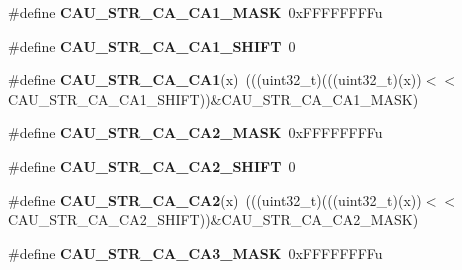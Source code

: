 \begin{DoxyCompactItemize}
\item 
\#define {\bfseries C\+A\+U\+\_\+\+S\+T\+R\+\_\+\+C\+A\+\_\+\+C\+A1\+\_\+\+M\+A\+SK}~0x\+F\+F\+F\+F\+F\+F\+F\+Fu\hypertarget{group__CAU__Register__Masks_gaf5468a65fe021f5053a4d9fa83c77614}{}\label{group__CAU__Register__Masks_gaf5468a65fe021f5053a4d9fa83c77614}

\item 
\#define {\bfseries C\+A\+U\+\_\+\+S\+T\+R\+\_\+\+C\+A\+\_\+\+C\+A1\+\_\+\+S\+H\+I\+FT}~0\hypertarget{group__CAU__Register__Masks_gaf733a0f562c8ff07f24843f2971c85ed}{}\label{group__CAU__Register__Masks_gaf733a0f562c8ff07f24843f2971c85ed}

\item 
\#define {\bfseries C\+A\+U\+\_\+\+S\+T\+R\+\_\+\+C\+A\+\_\+\+C\+A1}(x)~(((uint32\+\_\+t)(((uint32\+\_\+t)(x))$<$$<$C\+A\+U\+\_\+\+S\+T\+R\+\_\+\+C\+A\+\_\+\+C\+A1\+\_\+\+S\+H\+I\+FT))\&C\+A\+U\+\_\+\+S\+T\+R\+\_\+\+C\+A\+\_\+\+C\+A1\+\_\+\+M\+A\+SK)\hypertarget{group__CAU__Register__Masks_gac941842d240ab2902d1589d14f016339}{}\label{group__CAU__Register__Masks_gac941842d240ab2902d1589d14f016339}

\item 
\#define {\bfseries C\+A\+U\+\_\+\+S\+T\+R\+\_\+\+C\+A\+\_\+\+C\+A2\+\_\+\+M\+A\+SK}~0x\+F\+F\+F\+F\+F\+F\+F\+Fu\hypertarget{group__CAU__Register__Masks_ga7a41f2c437556c9a48ed99cd8607a9f9}{}\label{group__CAU__Register__Masks_ga7a41f2c437556c9a48ed99cd8607a9f9}

\item 
\#define {\bfseries C\+A\+U\+\_\+\+S\+T\+R\+\_\+\+C\+A\+\_\+\+C\+A2\+\_\+\+S\+H\+I\+FT}~0\hypertarget{group__CAU__Register__Masks_gad603664f3d10bcbd341a2d244c0822f5}{}\label{group__CAU__Register__Masks_gad603664f3d10bcbd341a2d244c0822f5}

\item 
\#define {\bfseries C\+A\+U\+\_\+\+S\+T\+R\+\_\+\+C\+A\+\_\+\+C\+A2}(x)~(((uint32\+\_\+t)(((uint32\+\_\+t)(x))$<$$<$C\+A\+U\+\_\+\+S\+T\+R\+\_\+\+C\+A\+\_\+\+C\+A2\+\_\+\+S\+H\+I\+FT))\&C\+A\+U\+\_\+\+S\+T\+R\+\_\+\+C\+A\+\_\+\+C\+A2\+\_\+\+M\+A\+SK)\hypertarget{group__CAU__Register__Masks_ga29ee0e2f04ffcc28051a093305a77a16}{}\label{group__CAU__Register__Masks_ga29ee0e2f04ffcc28051a093305a77a16}

\item 
\#define {\bfseries C\+A\+U\+\_\+\+S\+T\+R\+\_\+\+C\+A\+\_\+\+C\+A3\+\_\+\+M\+A\+SK}~0x\+F\+F\+F\+F\+F\+F\+F\+Fu\hypertarget{group__CAU__Register__Masks_ga52281a79b1f2f28a74652e8934c3e8e7}{}\label{group__CAU__Register__Masks_ga52281a79b1f2f28a74652e8934c3e8e7}


\end{DoxyCompactItemize}
